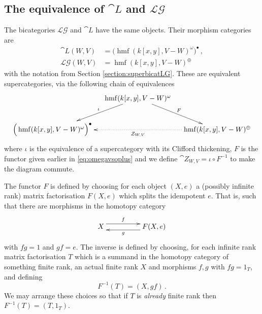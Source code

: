 \documentclass[english,letter paper,12pt,leqno]{article}
\theoremstyle{example}
\numberwithin{equation}{section}
\def\LG{\mathcal{LG}}
\def\be{\begin{equation}}
\def\ee{\end{equation}}
\DeclareMathOperator{\hmf}{hmf}
\begin{document}
\subsection{The equivalence of $\cat{L}$ and $\LG$}\label{section:equivalenceforreal}

The bicategories $\LG$ and $\cat{L}$ have the same objects. Their morphism categories are 
\begin{align*}
\cat{L}(W,V) &= \Big( \hmf( k[x,y], V - W )^{\omega} \Big)^{\bullet}\,,\\
\LG(W,V) &= \hmf( k[x,y], V - W )^{\oplus}
\end{align*}
with the notation from Section \ref{section:superbicatLG}. These are equivalent supercategories, via the following chain of equivalences
\be
\xymatrix@C-1pc{
& \ar[dl]_-{\iota}\hmf( k[x,y], V - W )^{\omega}\ar[dr]^-{F}\\
\Big( \hmf( k[x,y], V - W )^{\omega} \Big)^{\bullet} &  & \hmf( k[x,y], V - W )^{\oplus}\ar@{.>}[ll]^-{\cat{Z}_{W,V}}
}
\ee
where $\iota$ is the equivalence of a supercategory with its Clifford thickening, $F$ is the functor given earlier in \eqref{eq:omegavsoplus} and we define $\cat{Z}_{W,V} = \iota \circ F^{-1}$ to make the diagram commute. 

The functor $F$ is defined by choosing for each object $(X,e)$ a (possibly infinite rank) matrix factorisation $F(X,e)$ which splits the idempotent $e$. That is, such that there are morphisms in the homotopy category
\[
\xymatrix@C+2pc{
X \ar@<1ex>[r]^-{f} & F(X,e) \ar@<1ex>[l]^-{g}
}
\]
with $f g = 1$ and $gf = e$. The inverse is defined by choosing, for each infinite rank matrix factorisation $T$ which is a summand in the homotopy category of something finite rank, an actual finite rank $X$ and morphisms $f,g$ with $fg = 1_T$, and defining
\[
F^{-1}(T) = (X,gf)\,.
\]
We may arrange these choices so that if $T$ is \emph{already} finite rank then $F^{-1}(T) = (T, 1_T)$.
\end{document}
